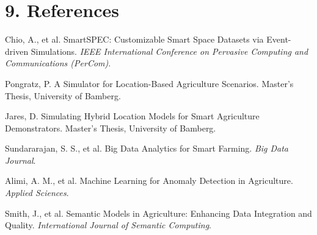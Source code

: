 \documentclass[11pt]{article}
\begin{document}
\section*{9. References}
\begin{thebibliography}{9}
 Chio, A., et al. SmartSPEC: Customizable Smart Space Datasets via Event-driven Simulations. \textit{IEEE International Conference on Pervasive Computing and Communications (PerCom)}.

 Pongratz, P. A Simulator for Location-Based Agriculture Scenarios. Master's Thesis, University of Bamberg.

 Jares, D. Simulating Hybrid Location Models for Smart Agriculture Demonstrators. Master's Thesis, University of Bamberg.

 Sundararajan, S. S., et al. Big Data Analytics for Smart Farming. \textit{Big Data Journal}.

 Alimi, A. M., et al. Machine Learning for Anomaly Detection in Agriculture. \textit{Applied Sciences}.

 Smith, J., et al. Semantic Models in Agriculture: Enhancing Data Integration and Quality. \textit{International Journal of Semantic Computing}.
\end{thebibliography}
\end{document}
